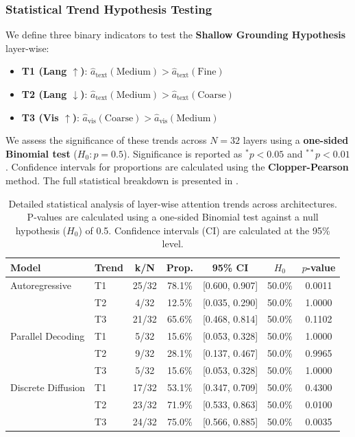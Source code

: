 \subsubsection{Statistical Trend Hypothesis Testing}
We define three binary indicators to test the \textbf{Shallow Grounding Hypothesis} layer-wise:
\begin{itemize}
    \item \textbf{T1 (Lang $\uparrow$)}: $\hat{a}_{\text{text}}(\text{Medium}) > \hat{a}_{\text{text}}(\text{Fine})$
    \item \textbf{T2 (Lang $\downarrow$)}: $\hat{a}_{\text{text}}(\text{Medium}) > \hat{a}_{\text{text}}(\text{Coarse})$
    \item \textbf{T3 (Vis $\uparrow$)}: $\hat{a}_{\text{vis}}(\text{Coarse}) > \hat{a}_{\text{vis}}(\text{Medium})$
\end{itemize}
We assess the significance of these trends across $N=32$ layers using a \textbf{one-sided Binomial test} ($H_0: p=0.5$). Significance is reported as $^{*}p < 0.05$ and $^{**}p < 0.01$. Confidence intervals for proportions are calculated using the \textbf{Clopper-Pearson} method. The full statistical breakdown is presented in .

\begin{table}[h]
\centering
\small
\begin{tabular}{ll cccc c}
\toprule
\textbf{Model} & \textbf{Trend} & \textbf{k/N} & \textbf{Prop.} & \textbf{95\% CI} & \textbf{$H_0$} & \textbf{$p$-value} \\
\midrule
Autoregressive     & T1 & 25/32 & 78.1\% & [0.600, 0.907] & 50.0\% & 0.0011 \\
                   & T2 & 4/32  & 12.5\% & [0.035, 0.290] & 50.0\% & 1.0000 \\
                   & T3 & 21/32 & 65.6\% & [0.468, 0.814] & 50.0\% & 0.1102 \\
\midrule
Parallel Decoding  & T1 & 5/32  & 15.6\% & [0.053, 0.328] & 50.0\% & 1.0000 \\
                   & T2 & 9/32  & 28.1\% & [0.137, 0.467] & 50.0\% & 0.9965 \\
                   & T3 & 5/32  & 15.6\% & [0.053, 0.328] & 50.0\% & 1.0000 \\
\midrule
Discrete Diffusion & T1 & 17/32 & 53.1\% & [0.347, 0.709] & 50.0\% & 0.4300 \\
                   & T2 & 23/32 & 71.9\% & [0.533, 0.863] & 50.0\% & 0.0100 \\
                   & T3 & 24/32 & 75.0\% & [0.566, 0.885] & 50.0\% & 0.0035 \\
\bottomrule
\end{tabular}
\caption{Detailed statistical analysis of layer-wise attention trends across architectures. P-values are calculated using a one-sided Binomial test against a null hypothesis ($H_0$) of 0.5. Confidence intervals (CI) are calculated at the 95\% level.}
\label{tab:full_stats_appendix}
\end{table}


